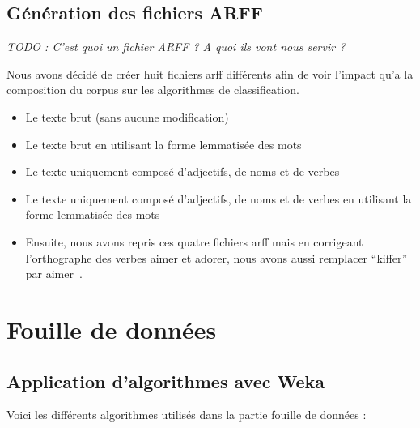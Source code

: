 \documentclass[a4paper, 11pt]{article}
\begin{document}
\subsection{Génération des fichiers ARFF}

\textit{TODO : C'est quoi un fichier ARFF ? A quoi ils vont nous servir ?\\}

Nous avons décidé de créer huit fichiers arff différents afin de voir l'impact qu'a la composition du corpus sur les algorithmes de classification.

\begin{itemize}
 \item Le texte brut (sans aucune modification)
 \item Le texte brut en utilisant la forme lemmatisée des mots
 \item Le texte uniquement composé d'adjectifs, de noms et de verbes
 \item Le texte uniquement composé d'adjectifs, de noms et de verbes en utilisant la forme lemmatisée des mots
 \vspace{0.5cm}
 \item Ensuite, nous avons repris ces quatre fichiers arff mais en corrigeant l'orthographe des verbes aimer et adorer, nous avons aussi remplacer ``kiffer'' par aimer\
.
\end{itemize}

\section{Fouille de données}

\subsection{Application d'algorithmes avec Weka}

Voici les différents algorithmes utilisés dans la partie fouille de données : \\
\end{document}
